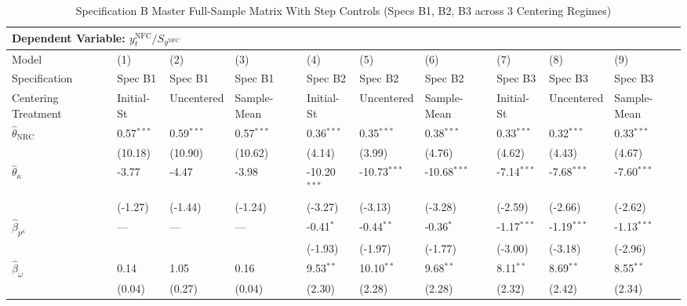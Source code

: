 \begin{landscape}
\begin{table}[H]
\centering
\caption{Specification B Master Full-Sample Matrix With Step Controls (Specs B1, B2, B3 across 3 Centering Regimes)}
\label{tab:specB_fs_master_with_dummies}
\small
\begin{tabular}{p{4.8cm}p{1.3cm}p{1.3cm}p{1.3cm}p{1.3cm}p{1.3cm}p{1.3cm}p{1.3cm}p{1.3cm}p{1.3cm}}
\toprule
\multicolumn{10}{l}{\textbf{Dependent Variable: $y_t^{\text{NFC}} / S_{y^{\text{NFC}}}$}} \\
\midrule
Model & (1) & (2) & (3) & (4) & (5) & (6) & (7) & (8) & (9)  \\
Specification & Spec B1 & Spec B1 & Spec B1 & Spec B2 & Spec B2 & Spec B2 & Spec B3 & Spec B3 & Spec B3  \\
Centering Treatment & Initial-St & Uncentered & Sample-Mean & Initial-St & Uncentered & Sample-Mean & Initial-St & Uncentered & Sample-Mean  \\
\midrule
$\hat{\theta}_{\text{NRC}}$ & 0.57$^{***}$ & 0.59$^{***}$ & 0.57$^{***}$ & 0.36$^{***}$ & 0.35$^{***}$ & 0.38$^{***}$ & 0.33$^{***}$ & 0.32$^{***}$ & 0.33$^{***}$  \\
 & {\scriptsize (10.18)} & {\scriptsize (10.90)} & {\scriptsize (10.62)} & {\scriptsize (4.14)} & {\scriptsize (3.99)} & {\scriptsize (4.76)} & {\scriptsize (4.62)} & {\scriptsize (4.43)} & {\scriptsize (4.67)}  \\
$\hat{\theta}_{\kappa}$ & -3.77 & -4.47 & -3.98 & -10.20$^{***}$ & -10.73$^{***}$ & -10.68$^{***}$ & -7.14$^{***}$ & -7.68$^{***}$ & -7.60$^{***}$  \\
 & {\scriptsize (-1.27)} & {\scriptsize (-1.44)} & {\scriptsize (-1.24)} & {\scriptsize (-3.27)} & {\scriptsize (-3.13)} & {\scriptsize (-3.28)} & {\scriptsize (-2.59)} & {\scriptsize (-2.66)} & {\scriptsize (-2.62)}  \\
$\hat{\beta}_{p^{\kappa}}$ & --- & --- & --- & -0.41$^{*}$ & -0.44$^{**}$ & -0.36$^{*}$ & -1.17$^{***}$ & -1.19$^{***}$ & -1.13$^{***}$  \\
 &  &  &  & {\scriptsize (-1.93)} & {\scriptsize (-1.97)} & {\scriptsize (-1.77)} & {\scriptsize (-3.00)} & {\scriptsize (-3.18)} & {\scriptsize (-2.96)}  \\
$\hat{\beta}_{\omega}$ & 0.14 & 1.05 & 0.16 & 9.53$^{**}$ & 10.10$^{**}$ & 9.68$^{**}$ & 8.11$^{**}$ & 8.69$^{**}$ & 8.55$^{**}$  \\
 & {\scriptsize (0.04)} & {\scriptsize (0.27)} & {\scriptsize (0.04)} & {\scriptsize (2.30)} & {\scriptsize (2.28)} & {\scriptsize (2.28)} & {\scriptsize (2.32)} & {\scriptsize (2.42)} & {\scriptsize (2.34)}  \\

\end{tabular}
\end{table}
\end{landscape}
